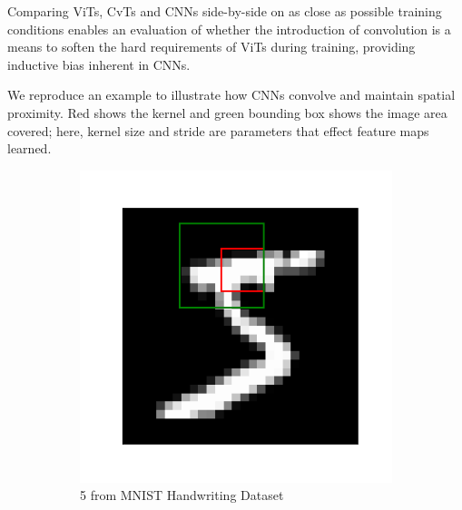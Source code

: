 Comparing ViTs, CvTs and CNNs side-by-side on as close as possible training conditions enables an evaluation of whether the introduction of convolution is a means to soften the hard requirements of ViTs during training, providing inductive bias inherent in CNNs. 

We reproduce an example to illustrate how CNNs convolve and maintain spatial proximity. Red shows the kernel and green bounding box shows the image area covered; here, kernel size and stride are parameters that effect feature maps learned. 

\begin{figure}
    \centering
    \begin{subfigure}[b]{0.2\textwidth}
        \includegraphics[width=\textwidth]{figures/research_methadology/mnist_five.png}
        \caption{5 from MNIST Handwriting Dataset \cite{LeCun1998}}
        \label{fig:MNIST 5}
    \end{subfigure}
    \hspace{10mm}
    \begin{subfigure}[b]{0.2\textwidth}

\end{subfigure}
\end{figure}
